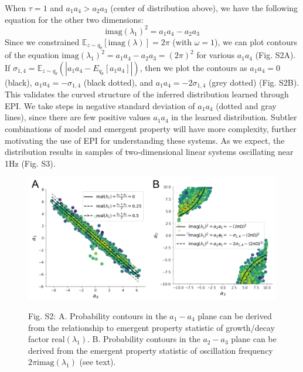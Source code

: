 \documentclass[11pt]{article}
\begin{document}
When $\tau=1$ and $a_1 a_4 > a_2 a_3$ (center of distribution above), we have the following equation for the other two dimensions:
\begin{equation}
\text{imag}(\lambda_1)^2 = a_1 a_4 - a_2 a_3
\end{equation}
Since we constrained $\mathbb{E}_{z \sim q_\theta}\left[\text{imag}(\lambda)\right] = 2 \pi$ (with $\omega=1$), we can plot contours of the equation $\text{imag}(\lambda_1)^2 = a_1 a_4 - a_2 a_3 = (2 \pi)^2$ for various $a_1 a_4$ (Fig. S2A). If $\sigma_{1,4} = \mathbb{E}_{z \sim q_\theta}(|a_1 a_4 - E_{q_\theta}[a_1 a_4]|)$, then we plot the contours as $a_1 a_4 = 0$ (black), $a_1 a_4 = -\sigma_{1,4}$ (black dotted), and $a_1 a_4 = -2\sigma_{1,4}$ (grey dotted) (Fig. S2B). This validates the curved structure of the inferred distribution learned through EPI.  We take steps in negative standard deviation of $a_1 a_4$ (dotted and gray lines), since there are few positive values $a_1 a_4$ in the learned distribution.  Subtler combinations of model and emergent property will have more complexity, further motivating the use of EPI for understanding these systems.  As we expect, the distribution results in samples of two-dimensional linear systems oscillating near 1Hz (Fig. S3).

\begin{figure}
\begin{center}
\includegraphics[scale=0.5]{figures/figS3/figS3.pdf}
\end{center}
\begin{flushleft}
Fig. S2: A. Probability contours in the $a_1-a_4$ plane can be derived from the relationship to emergent property statistic of growth/decay factor $\text{real}(\lambda_1)$. B. Probability contours in the $a_2-a_3$ plane can be derived from the emergent property statistic of oscillation frequency $2\pi \text{imag}(\lambda_1)$ (see text).
\end{flushleft}
\end{figure}
\end{document}
